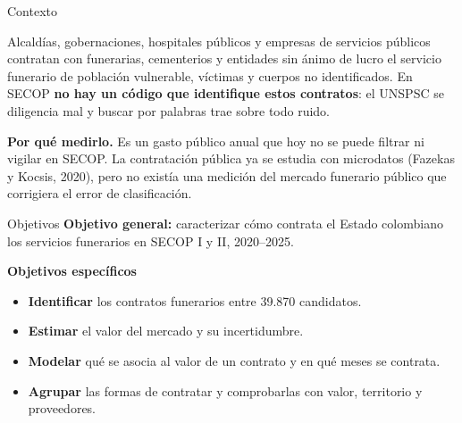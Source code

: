 


\begin{frame}[t]
\setlength{\altocolumnas}{\dimexpr\textheight-5.1cm\relax}
\vskip0.6cm
\begin{columns}[t]
\separatorcolumn

\begin{column}{\colwidth}
\begin{minipage}[t][\altocolumnas][s]{\linewidth}

  \begin{block}{Contexto}

    Alcaldías, gobernaciones, hospitales públicos y empresas de servicios públicos contratan con funerarias, cementerios y entidades sin ánimo de lucro el servicio funerario de población vulnerable, víctimas y cuerpos no identificados. En SECOP \textbf{no hay un código que identifique estos contratos}: el UNSPSC se diligencia mal y buscar por palabras trae sobre todo ruido.

    \textbf{Por qué medirlo.} Es un gasto público anual que hoy no se puede filtrar ni vigilar en SECOP. La contratación pública ya se estudia con microdatos (Fazekas y Kocsis, 2020), pero no existía una medición del mercado funerario público que corrigiera el error de clasificación.

  \end{block}
  \vfill

  \begin{block}{Objetivos}
    \textbf{\color{tinta}Objetivo general:} caracterizar cómo contrata el Estado colombiano los servicios funerarios en SECOP I y II, 2020–2025.

    {\bfseries\color{tinta}Objetivos específicos\par}
    \begin{itemize}
      \setlength{\itemsep}{0.4em}
      \item \textbf{Identificar} los contratos funerarios entre 39.870 candidatos.
      \item \textbf{Estimar} el valor del mercado y su incertidumbre.
      \item \textbf{Modelar} qué se asocia al valor de un contrato y en qué meses se contrata.
      \item \textbf{Agrupar} las formas de contratar y comprobarlas con valor, territorio y proveedores.
    \end{itemize}
  \end{block}
  \vfill


\end{minipage}
\end{column}
\end{columns}
\end{frame}
